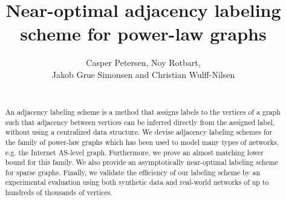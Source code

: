 \documentclass{acm_proc_article-sp}
\title{Near-optimal adjacency labeling scheme for power-law graphs}
\author{Casper Petersen, Noy Rotbart,\\ Jakob Grue Simonsen and Christian Wulff-Nilsen \\ \\
 }
\begin{document}
\begin{abstract}
An adjacency labeling scheme is a method that assigns labels to the vertices of a graph such that adjacency between vertices 
can be inferred directly from the assigned label, without using a  centralized data structure.
We devise adjacency labeling schemes for  the family  of power-law graphs which  has been used to model many types of networks, e.g. the Internet AS-level graph. Furthermore, we  prove an almost matching  lower bound for this family.
We also provide an asymptotically near-optimal  labeling scheme for sparse graphs.
Finally, we validate the efficiency of our labeling scheme by  an experimental evaluation  using both synthetic data and real-world networks of up to hundreds of thousands of vertices. 
\end{abstract}
%
%
%
%
%
%
%
% 
%
%

%
\end{document}
